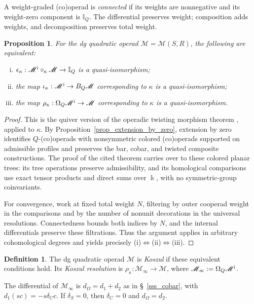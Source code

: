 \documentclass[11pt,letterpaper]{article}
\numberwithin{equation}{section}
\theoremstyle{plain}
\newtheorem{prop}[thm]{Proposition}
\theoremstyle{definition}
\newtheorem{defn}[thm]{Definition}
\theoremstyle{remark}
\newcommand{\antishriek}{%
	\mathord{\mathchoice
		{\rotatebox[origin=c]{180}{$\displaystyle !$}}
		{\rotatebox[origin=c]{180}{$\textstyle !$}}
		{\rotatebox[origin=c]{180}{$\scriptstyle !$}}
		{\rotatebox[origin=c]{180}{$\scriptscriptstyle !$}}}}
\begin{document}
A weight-graded (co)operad is \textit{connected} if its weights are nonnegative and its weight-zero component is $\mathbb I_Q$. The differential preserves weight; composition adds weights, and decomposition preserves total weight.

\begin{prop}\label{thm_koszul_criterion_E_operad}
For the dg quadratic operad $\mathscr M=\mathscr M(S,R)$, the following are equivalent:
\begin{enumerate}[(i)]
\item $\epsilon_\kappa:\mathscr M^{\antishriek}\circ_\kappa\mathscr M\to\mathbb I_Q$ is a quasi-isomorphism;
\item the map $\iota_\kappa:\mathscr M^{\antishriek}\to B_Q\mathscr M$ corresponding to $\kappa$ is a quasi-isomorphism;
\item the map $\rho_\kappa:\Omega_Q\mathscr M^{\antishriek}\to\mathscr M$ corresponding to $\kappa$ is a quasi-isomorphism.
\end{enumerate}
\end{prop}
\begin{proof}
This is the quiver version of the operadic twisting morphism theorem
\cite[Theorem~6.6.2]{loday2012algebraic}, applied to $\kappa$.
By Proposition~\ref{prop_extension_by_zero}, extension by zero identifies
$Q$-(co)operads with nonsymmetric colored (co)operads supported on
admissible profiles and preserves the bar, cobar, and twisted composite
constructions. The proof of the cited theorem carries over to these
colored planar trees: its tree operations preserve admissibility, and
its homological comparisons use exact tensor products and direct sums
over $\Bbbk$, with no symmetric-group coinvariants.

For convergence, work at fixed total weight $N$, filtering by outer
cooperad weight in the comparisons and by the number of nonunit
decorations in the universal resolutions. Connectedness bounds both
indices by $N$, and the internal differentials preserve these
filtrations. Thus the argument applies in arbitrary cohomological
degrees and yields precisely (i)$\Leftrightarrow$(ii)$\Leftrightarrow$(iii).
\end{proof}
\begin{defn}\label{defn_koszul_fc_multicategory}
The dg quadratic operad $\mathscr M$ is \textit{Koszul} if these equivalent conditions hold. Its \textit{Koszul resolution} is $\rho_\kappa:\mathscr M_\infty\to\mathscr M$, where $\mathscr M_\infty:=\Omega_Q\mathscr M^{\antishriek}$.
\end{defn}
The differential of $\mathscr M_\infty$ is $d_\Omega=d_1+d_2$ as in \S~\ref{sss_cobar}, with $d_1(sc)=-s\delta_Cc$. If $\delta_S=0$, then $\delta_C=0$ and $d_\Omega=d_2$.
\end{document}
